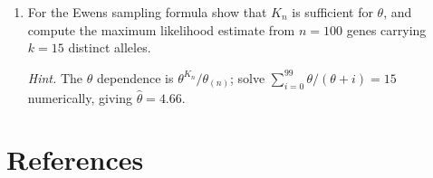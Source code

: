 \begin{enumerate}[label=\arabic*.,leftmargin=*]
\emph{Hint.} The gap is $\sum_\ell\Var(\delta_\ell\mid y)$; near the threshold the posterior for
$\kappa$ is spread over both prongs.

\item For the Ewens sampling formula show that $K_n$ is sufficient for $\theta$, and compute the
maximum likelihood estimate from $n=100$ genes carrying $k=15$ distinct alleles.

\emph{Hint.} The $\theta$ dependence is $\theta^{K_n}/\theta_{(n)}$; solve
$\sum_{i=0}^{99}\theta/(\theta+i)=15$ numerically, giving $\hat\theta=4.66$.
\end{enumerate}

\section*{References}

